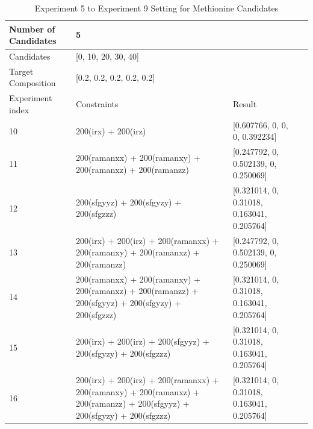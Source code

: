 \begin{table}\tiny \label{tab:4.3}
\begin{center}
\begin{tabular}{| l | p{3cm} | l | l |}
\hline
Number of Candidates & \multicolumn{2}{l|}{5} \\ \hline
Candidates & \multicolumn{2}{l|}{[0, 10, 20, 30, 40]} \\ \hline
Target Composition & \multicolumn{2}{l|}{[0.2, 0.2, 0.2, 0.2, 0.2]} \\ \hline
Experiment index & Constraints & Result  \\ \hline
10 & 200(irx) + 200(irz)  & [0.607766, 0, 0, 0, 0.392234]  \\ \hline
11 & 200(ramanxx) + 200(ramanxy) + 200(ramanxz) + 200(ramanzz)  & [0.247792, 0, 0.502139, 0, 0.250069]  \\ \hline
12 & 200(sfgyyz) + 200(sfgyzy) + 200(sfgzzz) & [0.321014, 0, 0.31018, 0.163041, 0.205764]  \\ \hline
13 & 200(irx) + 200(irz) + 200(ramanxx) + 200(ramanxy) + 200(ramanxz) + 200(ramanzz) & [0.247792, 0, 0.502139, 0, 0.250069]  \\ \hline
14 & 200(ramanxx) + 200(ramanxy) + 200(ramanxz) + 200(ramanzz) + 200(sfgyyz) + 200(sfgyzy) + 200(sfgzzz) & [0.321014, 0, 0.31018, 0.163041, 0.205764]  \\ \hline
15 & 200(irx) + 200(irz) + 200(sfgyyz) + 200(sfgyzy) + 200(sfgzzz) & [0.321014, 0, 0.31018, 0.163041, 0.205764]  \\ \hline
16 & 200(irx) + 200(irz) + 200(ramanxx) + 200(ramanxy) + 200(ramanxz) + 200(ramanzz) + 200(sfgyyz) + 200(sfgyzy) + 200(sfgzzz) & [0.321014, 0, 0.31018, 0.163041, 0.205764]  \\ \hline
\end{tabular} 
\end{center}
\caption{Experiment 5 to Experiment 9 Setting for Methionine Candidates}
\end{table}



